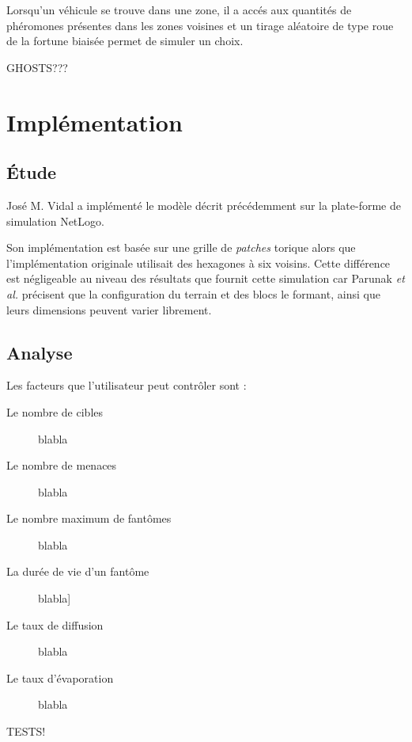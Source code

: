\documentclass[12pt]{article}
\begin{document}
Lorsqu'un véhicule se trouve dans une zone, il a accés aux quantités de phéromones présentes dans les zones voisines et
un tirage aléatoire de type roue de la fortune biaisée permet de simuler un choix.

GHOSTS???

\section{Implémentation}

\subsection{\'Etude}

José M. Vidal a implémenté le modèle décrit précédemment sur la plate-forme de simulation NetLogo.

Son implémentation est basée sur une grille de \textit{patches} torique alors que l'implémentation originale
utilisait des hexagones à six voisins. Cette différence est négligeable au niveau des résultats que fournit cette
simulation car Parunak \textit{et al.} précisent que la configuration du terrain et des blocs le formant, ainsi que
leurs dimensions peuvent varier librement.

\subsection{Analyse}

Les facteurs que l'utilisateur peut contrôler sont :

\begin{description}
  \item[Le nombre de cibles]{blabla}
  \item[Le nombre de menaces]{blabla}
  \item[Le nombre maximum de fantômes]{blabla}
  \item[La durée de vie d'un fantôme]{blabla}]
  \item[Le taux de diffusion]{blabla}
  \item[Le taux d'évaporation]{blabla}
\end{description}

TESTS!



\end{document}
